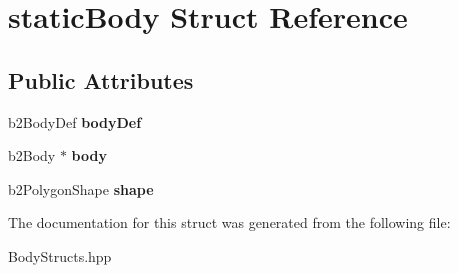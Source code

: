 \hypertarget{structstatic_body}{\section{static\-Body Struct Reference}
\label{structstatic_body}
}
\subsection*{Public Attributes}
\begin{DoxyCompactItemize}
\item 
\hypertarget{structstatic_body_a1315c6cd5f3473621aa470170286cbeb}{b2\-Body\-Def {\bfseries body\-Def}}\label{structstatic_body_a1315c6cd5f3473621aa470170286cbeb}

\item 
\hypertarget{structstatic_body_a6e1b92e9d231e6be48f53683cf43620a}{b2\-Body $\ast$ {\bfseries body}}\label{structstatic_body_a6e1b92e9d231e6be48f53683cf43620a}

\item 
\hypertarget{structstatic_body_a3d0943215d4baf0c7c83b2ab5ea67d3f}{b2\-Polygon\-Shape {\bfseries shape}}\label{structstatic_body_a3d0943215d4baf0c7c83b2ab5ea67d3f}

\end{DoxyCompactItemize}


The documentation for this struct was generated from the following file\-:\begin{DoxyCompactItemize}
\item 
Body\-Structs.\-hpp\end{DoxyCompactItemize}
